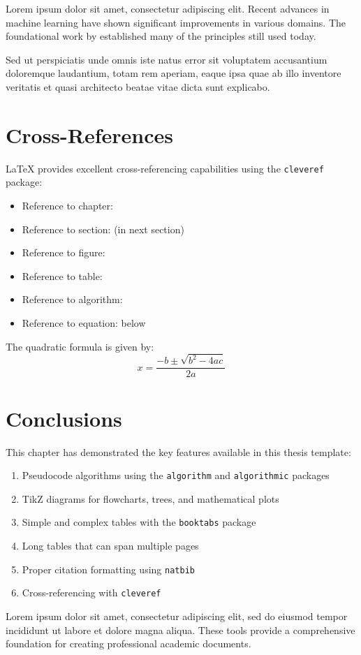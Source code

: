 Lorem ipsum dolor sit amet, consectetur adipiscing elit. Recent advances in machine learning \citep{cormen2009introduction} have shown significant improvements in various domains. The foundational work by \citet{knuth1984texbook} established many of the principles still used today.

Sed ut perspiciatis unde omnis iste natus error sit voluptatem accusantium doloremque laudantium, totam rem aperiam, eaque ipsa quae ab illo inventore veritatis et quasi architecto beatae vitae dicta sunt explicabo.

\section{Cross-References}

LaTeX provides excellent cross-referencing capabilities using the \texttt{cleveref} package:

\begin{itemize}
\item Reference to chapter: 
\item Reference to section:  (in next section)
\item Reference to figure: 
\item Reference to table: 
\item Reference to algorithm: 
\item Reference to equation:  below
\end{itemize}

The quadratic formula is given by:
\begin{equation}
x = \frac{-b \pm \sqrt{b^2 - 4ac}}{2a}
\label{eq:example}
\end{equation}

\section{Conclusions}
\label{sec:conclusions}

This chapter has demonstrated the key features available in this thesis template:

\begin{enumerate}
\item Pseudocode algorithms using the \texttt{algorithm} and \texttt{algorithmic} packages
\item TikZ diagrams for flowcharts, trees, and mathematical plots
\item Simple and complex tables with the \texttt{booktabs} package
\item Long tables that can span multiple pages
\item Proper citation formatting using \texttt{natbib}
\item Cross-referencing with \texttt{cleveref}
\end{enumerate}

Lorem ipsum dolor sit amet, consectetur adipiscing elit, sed do eiusmod tempor incididunt ut labore et dolore magna aliqua. These tools provide a comprehensive foundation for creating professional academic documents.